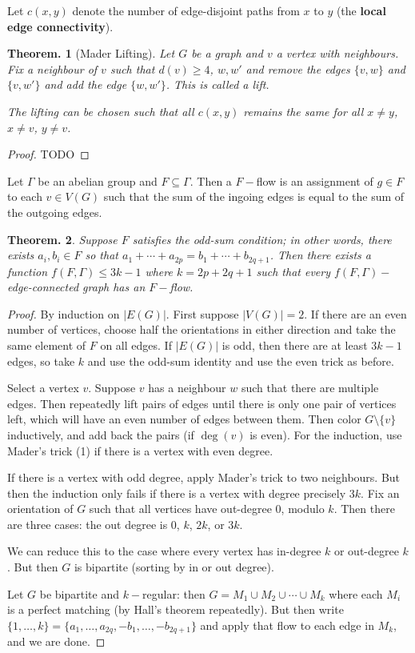 \documentclass[11pt, a4paper]{memoir}
\theoremstyle{change}
\newtheorem{theorem}{Theorem.}[section]
\theoremstyle{plain}
\theoremstyle{nonumberplain}
\newtheorem{proof}{Proof}
\numberwithin{equation}{section}
\begin{document}
Let $c(x,y)$ denote the number of edge-disjoint paths from $x$ to $y$ (the \textbf{local edge connectivity}).
\begin{theorem}[Mader Lifting]
    Let $G$ be a graph and $v$ a vertex with neighbours.
    Fix a neighbour of $v$ such that $d(v)\geq 4$, $w,w'$ and remove the edges $\{v,w\}$ and $\{v,w'\}$ and add the edge $\{w,w'\}$.
    This is called a lift.

    The lifting can be chosen such that all $c(x,y)$ remains the same for all $x\neq y$, $x\neq v$, $y\neq v$.
\end{theorem}
\begin{proof}
    TODO
\end{proof}
Let $\Gamma$ be an abelian group and $F\subseteq\Gamma$.
Then a $F-$flow is an assignment of $g\in F$ to each $v\in V(G)$ such that the sum of the ingoing edges is equal to the sum of the outgoing edges.
\begin{theorem}
    Suppose $F$ satisfies the odd-sum condition; in other words, there exists $a_i,b_i\in F$ so that $a_1+\cdots+a_{2p}=b_1+\cdots+b_{2q+1}$.
    Then there exists a function $f(F,\Gamma)\leq 3k-1$ where $k=2p+2q+1$ such that every $f(F,\Gamma)-$edge-connected graph has an $F-$flow.
\end{theorem}
\begin{proof}
    By induction on $|E(G)|$.
    First suppose $|V(G)|=2$.
    If there are an even number of vertices, choose half the orientations in either direction and take the same element of $F$ on all edges.
    If $|E(G)|$ is odd, then there are at least $3k-1$ edges, so take $k$ and use the odd-sum identity and use the even trick as before.

    Select a vertex $v$.
    Suppose $v$ has a neighbour $w$ such that there are multiple edges.
    Then repeatedly lift pairs of edges until there is only one pair of vertices left, which will have an even number of edges between them.
    Then color $G\setminus\{v\}$ inductively, and add back the pairs (if $\deg(v)$ is even).
    For the induction, use Mader's trick (1) if there is a vertex with even degree.

    If there is a vertex with odd degree, apply Mader's trick to two neighbours.
    But then the induction only fails if there is a vertex with degree precisely $3k$.
    Fix an orientation of $G$ such that all vertices have out-degree 0, modulo $k$.
    Then there are three cases: the out degree is $0$, $k$, $2k$, or $3k$.

    We can reduce this to the case where every vertex has in-degree $k$ or out-degree $k$.
    But then $G$ is bipartite (sorting by in or out degree).

    Let $G$ be bipartite and $k-$regular: then $G=M_1\cup M_2\cup\cdots\cup M_k$ where each $M_i$ is a perfect matching (by Hall's theorem repeatedly).
    But then write $\{1,\ldots,k\}=\{a_1,\ldots,a_{2q},-b_1,\ldots,-b_{2q+1}\}$ and apply that flow to each edge in $M_k$, and we are done.
\end{proof}
\end{document}
